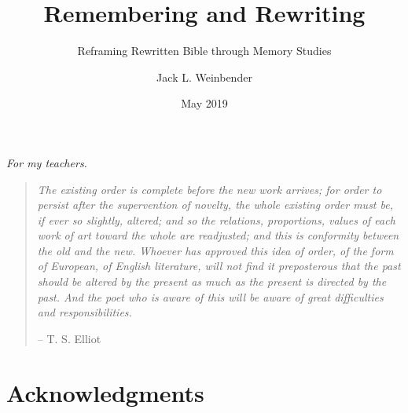 

\author{Jack L. Weinbender}
\date{May 2019}
\title{Remembering and Rewriting}
\subtitle{Reframing Rewritten Bible through Memory Studies}


\makecopyright


\makesignatures

\maketitle

\clearpage
\vspace*{3in}
\begin{center}
  {\large\itshape For my teachers.}
\end{center}

\clearpage
\vspace*{2in}
\begin{quote}
  \emph{The existing order is complete before the new work arrives; for order to persist after the supervention of novelty, the whole existing order must be, if ever so slightly, altered; and so the relations, proportions, values of each work of art toward the whole are readjusted; and this is conformity between the old and the new. Whoever has approved this idea of order, of the form of European, of English literature, will not find it preposterous that the past should be altered by the present as much as the present is directed by the past. And the poet who is aware of this will be aware of great difficulties and responsibilities.}

  \begin{center}
    -- T. S. Elliot
  \end{center}
\end{quote}

\clearpage
\chapter*{Acknowledgments}

